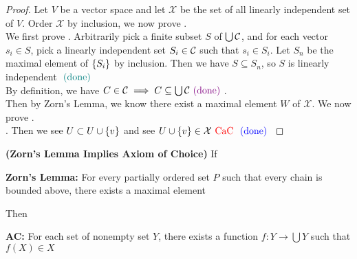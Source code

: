 \documentclass{report}
\begin{document}
\begin{proof}
  Let $V$ be a vector space and let  $\mathcal{X}$ be the set of all linearly independent set of  $V$.  Order  $\mathcal{X}$ by inclusion, we now prove .\\

We first prove . Arbitrarily pick a finite subset $S$ of  $\bigcup \mathcal{C}$, and for each vector $s_i \in S$, pick a linearly independent set $S_i \in \mathcal{C}$ such that $s_i \in S_i$. Let $S_n$ be the maximal element of  $\{ S_i \}$ by inclusion. Then we have $S\subseteq S_n$, so $S$ is linearly independent $\textcolor{teal}{\text{ (done) }}$\\

By definition, we have $C\in \mathcal{C}\implies C \subseteq \bigcup \mathcal{C}\textcolor{violet}{\text{ (done) }}$.\\

Then by Zorn's Lemma, we know there exist a maximal element $W$ of $\mathcal{X}$. We now prove .\\

. Then we see $U\subset U\cup \{ v \}$ and see $U\cup \{ v \}\in \mathcal{X}\text{ \textcolor{red}{CaC} }\textcolor{blue}{\text{ (done) }}$
\end{proof}
\begin{theorem}
\label{2.3.12}
\textbf{(Zorn's Lemma Implies Axiom of Choice)} If 
\begin{center}
    \begin{minipage}{0.9\linewidth}  
        \centering
\textbf{Zorn's Lemma:} For every partially ordered set $P$ such that every chain is bounded above, there exists a maximal element     
    \end{minipage}
\end{center}
Then
\begin{center}
    \begin{minipage}{0.9\linewidth}  
        \centering
        \textbf{AC:} For each set of nonempty set  $Y$, there exists a function $f:Y\rightarrow \bigcup Y$ such that $f(X)\in X$ 
    \end{minipage}
\end{center}
\end{theorem}
\end{document}
